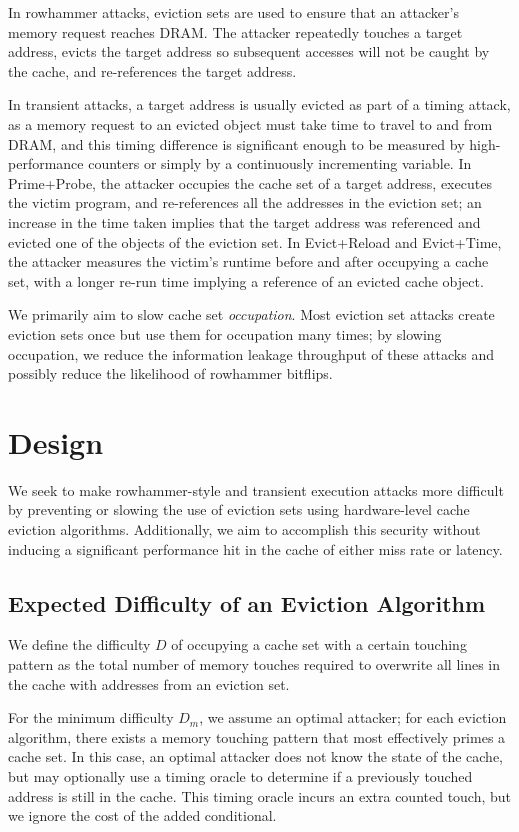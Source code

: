 \documentclass[letterpaper]{article}
\begin{document}
In rowhammer attacks, eviction sets are used to ensure that an attacker's memory request reaches DRAM.
The attacker repeatedly touches a target address, evicts the target address so subsequent accesses will not be caught by the cache,
and re-references the target address.

In transient attacks, a target address is usually evicted as part of a timing attack, as a memory request to an evicted object
must take time to travel to and from DRAM, and this timing difference is significant enough to be measured
by high-performance counters or simply by a continuously incrementing variable.
In Prime+Probe, the attacker occupies the cache set of a target address, executes the victim program, and re-references
all the addresses in the eviction set; an increase in the time taken implies that the target address was referenced and evicted
one of the objects of the eviction set.
In Evict+Reload and Evict+Time, the attacker measures the victim's runtime before and after occupying a cache set,
with a longer re-run time implying a reference of an evicted cache object.

We primarily aim to slow cache set \textit{occupation}.
Most eviction set attacks create eviction sets once but use them for occupation many times;
by slowing occupation, we reduce the information leakage throughput of these attacks
and possibly reduce the likelihood of rowhammer bitflips.

\section{Design}

We seek to make rowhammer-style and transient execution attacks more difficult by preventing or slowing the use of eviction sets
using hardware-level cache eviction algorithms.
Additionally, we aim to accomplish this security without inducing a significant performance hit in the cache of either miss rate or latency.

\subsection{Expected Difficulty of an Eviction Algorithm}
We define the difficulty $D$ of occupying a cache set with a certain touching pattern
as the total number of memory touches required to overwrite all lines in the cache
with addresses from an eviction set.

For the minimum difficulty $D_m$, we assume an optimal attacker;
for each eviction algorithm, there exists a memory touching pattern that
most effectively primes a cache set.
In this case, an optimal attacker does not know the state of the cache,
but may optionally use a timing oracle to determine if a previously touched address
is still in the cache.
This timing oracle incurs an extra counted touch, but we ignore the cost of
the added conditional.
\end{document}
